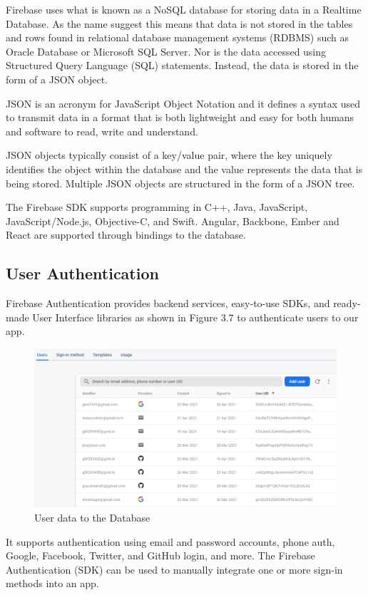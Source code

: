 Firebase uses what is known as a NoSQL database for storing data in a Realtime Database. As the name suggest this means that data is not stored in the tables and rows found in relational database management systems (RDBMS) such as Oracle Database or Microsoft SQL Server. Nor is the data accessed using Structured Query Language (SQL) statements. Instead, the data is stored in the form of a JSON object. 

JSON is an acronym for JavaScript Object Notation and it defines a syntax used to transmit data in a format that is both lightweight and easy for both humans and software to read, write and understand.

JSON objects typically consist of a key/value pair, where the key uniquely identifies the object within the database and the value represents the data that is being stored. Multiple JSON objects are structured in the form of a JSON tree.

The Firebase SDK supports programming in C++, Java, JavaScript, JavaScript/Node.js, Objective-C, and Swift. Angular, Backbone, Ember and React are supported through bindings to the database.\cite{firebase}


\subsection{User Authentication}
Firebase Authentication provides backend services, easy-to-use SDKs, and ready-made User Interface libraries as shown in Figure 3.7 to authenticate users to our app.
\begin{figure}[ht]
    \centering
    \includegraphics[scale=0.5]{img/auth.PNG}
    \caption{User data to the Database}
    \label{fig:my_labe2}
\end{figure}



It supports authentication using email and password accounts, phone auth, Google, Facebook, Twitter, and GitHub login, and more. The Firebase Authentication (SDK) can be used to manually integrate one or more sign-in methods into an app.\cite{fbauth}

